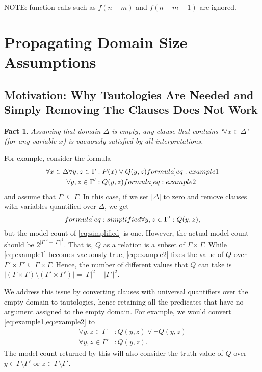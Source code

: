 \documentclass{article}
\newtheorem{fact}{Fact}
\begin{document}
NOTE: function calls such as $f(n-m)$ and $f(n-m-1)$ are ignored.

\section{Propagating Domain Size Assumptions}\label{sec:simplifying}

\subsection{Motivation: Why Tautologies Are Needed and Simply Removing The
  Clauses Does Not Work}

\begin{fact}
  Assuming that domain $\Delta$ is empty, any clause that contains
  `$\forall x \in \Delta$' (for any variable $x$) is vacuously satisfied by all
  interpretations.
\end{fact}

For example, consider the formula
\begin{align}
  \forall x \in \Delta \forall y, z \in \Gamma &: P(x) \lor Q(y, z)\label[formula]{eq:example1}\\
  \forall y, z \in \Gamma' &: Q(y, z)\label[formula]{eq:example2}
\end{align}
and assume that $\Gamma' \subseteq \Gamma$. In this case, if we set $|\Delta|$
to zero and remove clauses with variables quantified over $\Delta$, we get
\begin{equation}\label[formula]{eq:simplified}
  \forall y, z \in \Gamma' : Q(y, z),
\end{equation}
but the model count of \cref{eq:simplified} is one. However, the actual model
count should be $2^{|\Gamma|^2 - |\Gamma'|^2}$. That is, $Q$ as a relation is a
subset of $\Gamma \times \Gamma$. While \cref{eq:example1} becomes vacuously
true, \cref{eq:example2} fixes the value of $Q$ over
$\Gamma' \times \Gamma' \subseteq \Gamma \times \Gamma$. Hence, the number of
different values that $Q$ can take is
$|(\Gamma \times \Gamma) \setminus (\Gamma' \times \Gamma')| = |\Gamma|^{2} - |\Gamma'|^{2}$.

We address this issue by converting clauses with universal quantifiers over the
empty domain to tautologies, hence retaining all the predicates that have no
argument assigned to the empty domain. For example, we would convert
\cref{eq:example1,eq:example2} to
\begin{align*}
  \forall y, z \in \Gamma &: Q(y, z) \lor \neg Q(y, z) \\
  \forall y, z \in \Gamma' &: Q(y, z).
\end{align*}
The model count returned by this will also consider the truth value of $Q$ over
$y \in \Gamma \setminus \Gamma'$ or $z \in \Gamma \setminus \Gamma'$.
\end{document}
